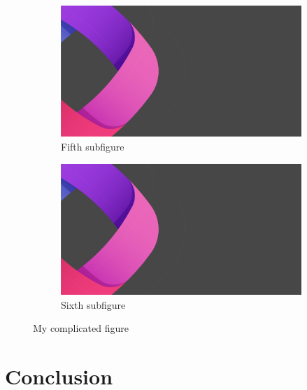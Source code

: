 \documentclass{article}
\begin{document}
\begin{figure}[t!]
\medskip
\begin{subfigure}{0.48\textwidth}
\includegraphics[width=\linewidth]{title.png}
\caption{Fifth subfigure} \label{fig:e}
\end{subfigure}\hspace*{\fill}
\begin{subfigure}{0.48\textwidth}
\includegraphics[width=\linewidth]{title.png}
\caption{Sixth subfigure} \label{fig:f}
\end{subfigure}

\caption{My complicated figure} \label{fig:1}
\end{figure}

\section{Conclusion}
\label{sec:conclusion}

  
\end{document}
